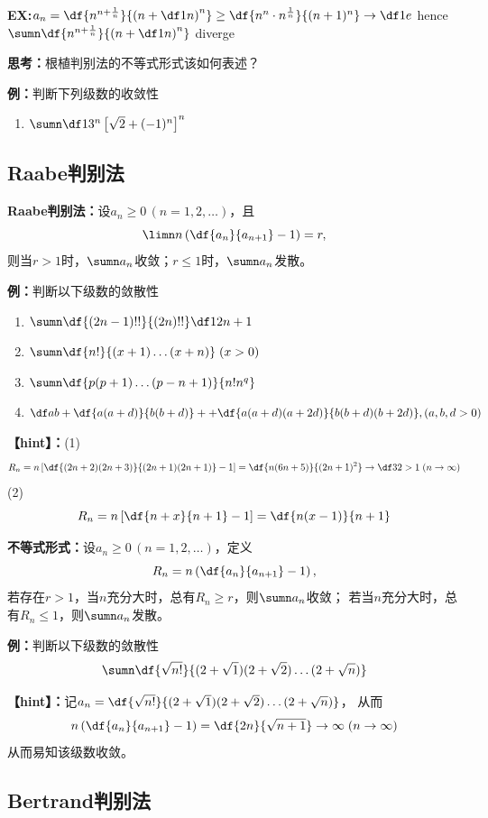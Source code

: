 {\bf EX:}$a_n=\df{n^{n+\frac1n}}{\left(n+\df1n\right)^n}
\geq\df{n^n\cdot n^{\frac1n}}{(n+1)^n}\to\df1e$
hence $\sumn\df{n^{n+\frac1n}}{\left(n+\df1n\right)^n}$ diverge

{\bf 思考：}根植判别法的不等式形式该如何表述？

{\bf 例：}判断下列级数的收敛性
\begin{enumerate} [(1)]
  \setlength{\itemindent}{1cm}
  \item $\sumn\df1{3^n}\left[\sqrt2+(-1)^n\right]^n$
\end{enumerate}

\begin{shaded}

\subsection{Raabe判别法}

{\bf Raabe判别法：}设$a_n\geq 0\,(n=1,2,\ldots)$，且
$$\limn n\left(\df{a_n}{a_{n+1}}-1\right)=r,$$
则当$r>1$时，$\sumn a_n$收敛；$r\leq 1$时，$\sumn a_n$发散。	

{\bf 例：}判断以下级数的敛散性
\begin{enumerate}[(1)]
  \setlength{\itemindent}{1cm}
  \item $\sumn\df{(2n-1)!!}{(2n)!!}\df 1{2n+1}$
  \item $\sumn\df{n!}{(x+1)\ldots(x+n)}\;(x>0)$
  \item $\sumn\df{p(p+1)\ldots(p-n+1)}{n!n^q}$
  \item $\df ab+\df{a(a+d)}{b(b+d)}++\df{a(a+d)(a+2d)}{b(b+d)(b+2d)},(a,b,d>0)$
\end{enumerate}

{\bf 【hint】：}(1)
$$R_n=n\left[\df{(2n+2)(2n+3)}{(2n+1)(2n+1)}-1\right]
=\df{n(6n+5)}{(2n+1)^2}\to\df32>1\;(n\to\infty)$$
(2)
$$R_n=n\left[\df{n+x}{n+1}-1\right]=\df{n(x-1)}{n+1}$$

{\bf 不等式形式：}设$a_n\geq 0\,(n=1,2,\ldots)$，定义
$$R_n=n\left(\df{a_n}{a_{n+1}}-1\right),$$
若存在$r>1$，当$n$充分大时，总有$R_n\geq r$，则$\sumn a_n$收敛；
若当$n$充分大时，总有$R_n\leq 1$，则$\sumn a_n$发散。

{\bf 例：}判断以下级数的敛散性
$$\sumn\df{\sqrt{n!}}{(2+\sqrt 1)(2+\sqrt 2)\ldots(2+\sqrt n)}$$

{\bf 【hint】：}记$a_n=\df{\sqrt{n!}}{(2+\sqrt 1)(2+\sqrt 2)\ldots(2+\sqrt n)}$，
从而
$$n\left(\df{a_n}{a_{n+1}}-1\right)=\df{2n}{\sqrt{n+1}}\to\infty\;(n\to\infty)$$
从而易知该级数收敛。

\subsection{Bertrand判别法}


\end{shaded}
